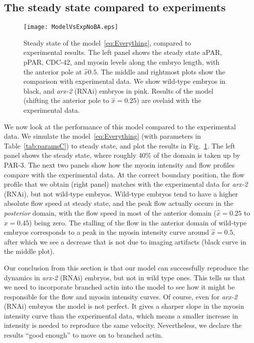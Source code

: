 \documentclass[11pt]{article}
\newcommand{\6}[1]{#1_{\text{6}}}
\newcommand{\3}[1]{#1_{\text{3}}}
\begin{document}
\subsection{The steady state compared to experiments}

\begin{figure}
\centering
\texttt{[image: ModelVsExpNoBA.eps]}
\caption{\label{fig:StStNoBA}Steady state of the model\ \eqref{eq:Everything}, compared to experimental results. The left panel shows the steady state aPAR, pPAR, CDC-42, and myosin levels along the embryo length, with the anterior pole at $\hat x 0.5$. The middle and rightmost plots show the comparison with experimental data. We show wild-type embryos in black, and \emph{arx-2} (RNAi) embryos in pink. Results of the model (shifting the anterior pole to $\hat x = 0.25$) are ovelaid with the experimental data.}
\end{figure}

We now look at the performance of this model compared to the experimental data. We simulate the model\ \eqref{eq:Everything} (with parameters in Table\ \ref{tab:paramsC}) to steady state, and plot the results in Fig.\ \ref{fig:StStNoBA}. The left panel shows the steady state, where roughly 40\% of the domain is taken up by PAR-3. The next two panels show how the myosin intensity and flow profiles compare with the experimental data. At the correct boundary position, the flow profile that we obtain (right panel) matches with the experimental data for \emph{arx-2} (RNAi), but not wild-type embryos. Wild-type embryos tend to have a higher absolute flow speed at steady state, and the peak flow actually occurs in the \emph{posterior} domain, with the flow speed in most of the anterior domain ($\hat x = 0.25$ to $\hat x = 0.45$) being zero. The stalling of the flow in the anterior domain of wild-type embryos corresponds to a peak in the myosin intensity curve around $\hat x = 0.5$, after which we see a decrease that is not due to imaging artifacts (black curve in the middle plot).

Our conclusion from this section is that our model can successfully reproduce the dynamics in \emph{arx-2} (RNAi) embryos, but not in wild type ones. This tells us that we need to incorporate branched actin into the model to see how it might be responsible for the flow and myosin intensity curves. Of course, even for \emph{arx-2} (RNAi) embryos the model is not perfect. It gives a sharper slope in the myosin intensity curve than the experimental data, which means a smaller increase in intensity is needed to reproduce the same velocity. Nevertheless, we declare the results ``good enough'' to move on to branched actin.
\end{document}
